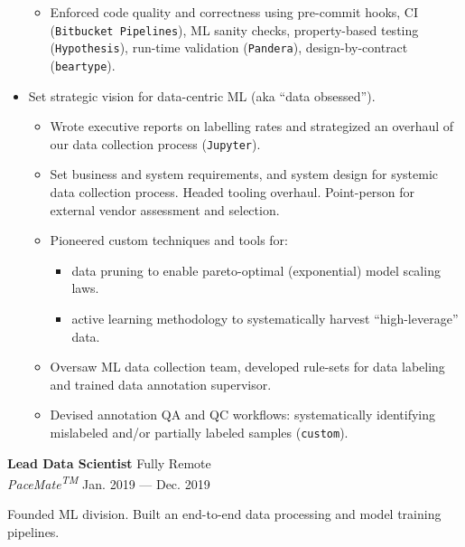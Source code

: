 \documentclass[a4paper,12pt]{article}
\newcommand{\ressubheading}[4]{{\begin{minipage}{\textwidth}
                                    \textbf{#1} \hfill #2 \\
                                    \textit{#3} \hfill #4 \\
\end{minipage}}}
\begin{document}
\begin{itemize}
\begin{itemize}
            \item Enforced code quality and correctness using pre-commit hooks, CI (\texttt{Bitbucket Pipelines}), ML sanity checks, property-based testing (\texttt{Hypothesis}), run-time validation (\texttt{Pandera}), design-by-contract (\texttt{beartype}).
        \end{itemize}
        \item Set strategic vision for data-centric ML (aka ``data obsessed'').
        \begin{itemize}
            \item Wrote executive reports on labelling rates and strategized an overhaul of our data collection process (\texttt{Jupyter}).
            \item Set business and system requirements, and system design for systemic data collection process. Headed tooling overhaul. Point-person for external vendor assessment and selection.
            \item Pioneered custom techniques and tools for:
            \begin{itemize}
                \item data pruning to enable pareto-optimal (exponential) model scaling laws.
                \item active learning methodology to systematically harvest ``high-leverage'' data.
            \end{itemize}
            \item Oversaw ML data collection team, developed rule-sets for data labeling and trained data annotation supervisor.
            \item Devised annotation QA and QC workflows: systematically identifying mislabeled and/or partially labeled samples (\texttt{custom}).
        \end{itemize}


    \end{itemize}


    \ressubheading{Lead Data Scientist}{Fully Remote}{PaceMate\textsuperscript{TM}}{Jan. 2019 --- Dec. 2019}

    \vspace{-6pt} Founded ML division. Built an end-to-end data processing and model training pipelines.
\end{document}
